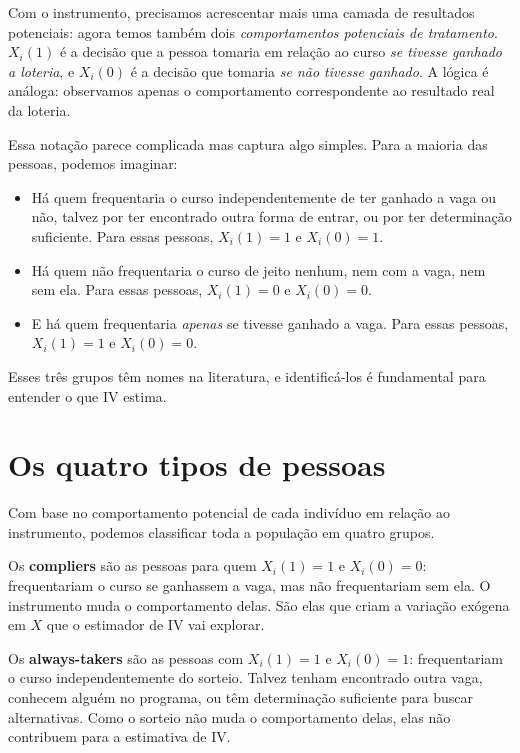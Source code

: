Com o instrumento, precisamos acrescentar mais uma camada de resultados potenciais: agora temos também dois \textit{comportamentos potenciais de tratamento}. $X_i(1)$ é a decisão que a pessoa tomaria em relação ao curso \textit{se tivesse ganhado a loteria}, e $X_i(0)$ é a decisão que tomaria \textit{se não tivesse ganhado}. A lógica é análoga: observamos apenas o comportamento correspondente ao resultado real da loteria.

Essa notação parece complicada mas captura algo simples. Para a maioria das pessoas, podemos imaginar:

\begin{itemize}[leftmargin=*]
  \item Há quem frequentaria o curso independentemente de ter ganhado a vaga ou não, talvez por ter encontrado outra forma de entrar, ou por ter determinação suficiente. Para essas pessoas, $X_i(1) = 1$ e $X_i(0) = 1$.
  \item Há quem não frequentaria o curso de jeito nenhum, nem com a vaga, nem sem ela. Para essas pessoas, $X_i(1) = 0$ e $X_i(0) = 0$.
  \item E há quem frequentaria \textit{apenas} se tivesse ganhado a vaga. Para essas pessoas, $X_i(1) = 1$ e $X_i(0) = 0$.
\end{itemize}

Esses três grupos têm nomes na literatura, e identificá-los é fundamental para entender o que IV estima.

\section{Os quatro tipos de pessoas}
\label{sec:tipos}

Com base no comportamento potencial de cada indivíduo em relação ao instrumento, podemos classificar toda a população em quatro grupos.

Os \textbf{compliers} são as pessoas para quem $X_i(1) = 1$ e $X_i(0) = 0$: frequentariam o curso se ganhassem a vaga, mas não frequentariam sem ela. O instrumento muda o comportamento delas. São elas que criam a variação exógena em $X$ que o estimador de IV vai explorar.

Os \textbf{always-takers} são as pessoas com $X_i(1) = 1$ e $X_i(0) = 1$: frequentariam o curso independentemente do sorteio. Talvez tenham encontrado outra vaga, conhecem alguém no programa, ou têm determinação suficiente para buscar alternativas. Como o sorteio não muda o comportamento delas, elas não contribuem para a estimativa de IV.

